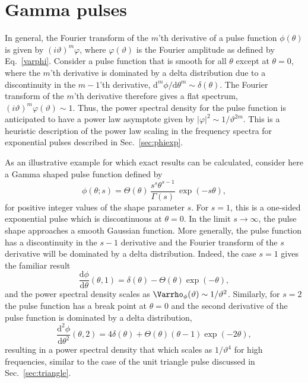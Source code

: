 \documentclass[aps,prb,12pt,a4paper,preprint,amsmath,amssymb,groupedaddress]{revtex4-1}
\newcommand{\abs}[1]{{\left|#1\right|}}\newcommand{\order}[1]{{\mathcal{O}\left(#1\right)}}
\newcommand{\rmd}{\text{d}}
\newcommand{\Eqref}[1]{Eq.~\eqref{#1}}
\newcommand{\Secref}[1]{Sec.~\ref{#1}}
\begin{document}
\section{Gamma pulses}\label{sec:gamma}



In general, the Fourier transform of the $m$'th derivative of a pulse function $\phi(\theta)$ is given by $(i\vartheta)^m\varphi$, where $\varphi(\vartheta)$ is the Fourier amplitude as defined by \Eqref{varphi}. Consider a pulse function that is smooth for all $\theta$ except at $\theta=0$, where the $m$'th derivative is dominated by a delta distribution due to a discontinuity in the $m-1$'th derivative, $\rmd^m\phi/\rmd\theta^m\sim\delta(\theta)$. The Fourier transform of the $m$'th derivative therefore gives a flat spectrum, $(i\vartheta)^m\varphi(\vartheta)\sim1$. Thus, the power spectral density for the pulse function is anticipated to have a power law asymptote given by $\abs{\varphi}^2\sim1/\vartheta^{2m}$. This is a heuristic description of the power law scaling in the frequency spectra for exponential pulses described in \Secref{sec:phiexp}.


As an illustrative example for which exact results can be calculated, consider here a Gamma shaped pulse function defined by
\begin{equation}
\phi(\theta;s) = \Theta(\theta)\,\frac{s^s\theta^{s-1}}{\Gamma(s)}\,\exp(-s\theta) ,
\end{equation}
for positive integer values of the shape parameter $s$. For $s=1$, this is a one-sided exponential pulse which is discontinuous at $\theta=0$. In the limit $s\rightarrow\infty$, the pulse shape approaches a smooth Gaussian function. More generally, the pulse function has a discontinuity in the $s-1$ derivative and the Fourier transform of the $s$ derivative will be dominated by a delta distribution. Indeed, the case $s=1$ gives the familiar result
\begin{equation}
\frac{\rmd\phi}{\rmd\theta}(\theta,1) = \delta(\theta) - \Theta(\theta)\exp(-\theta) ,
\end{equation}
and the power spectral density scales as $\Varrho_\phi(\vartheta)\sim1/\vartheta^2$.
Similarly, for $s=2$ the pulse function has a break point at $\theta=0$ and the second derivative of the pulse function is dominated by a delta distribution,
\begin{equation}
\frac{\rmd^2\phi}{\rmd\theta^2}(\theta,2) = 4\delta(\theta) + \Theta(\theta)(\theta-1)\exp(-2\theta) ,
\end{equation}
resulting in a power spectral density that which scales as $1/\vartheta^4$ for high frequencies, similar to the case of the unit triangle pulse discussed in \Secref{sec:triangle}.
\end{document}
